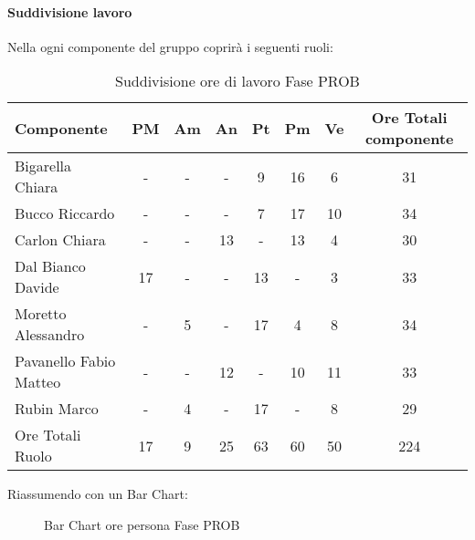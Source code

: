 			\paragraph{Suddivisione lavoro}
				Nella  ogni componente del gruppo \groupname{} coprirà i seguenti ruoli:
				\begin{table}
					\begin{center}
						\begin{tabular}{| l | c | c | c | c | c | c | c |}
							\hline
							Componente 					& PM		& Am 		& An 		& Pt 		& Pm 		& Ve 		& Ore Totali componente \\ \hline
							
							Bigarella Chiara 			& - 		& - 		& - 		& 9 		& 16 		& 6 		& 31 \\
							Bucco Riccardo 				& - 		& - 		& - 		& 7 		& 17		& 10 		& 34 \\
							Carlon Chiara	 			& - 		& - 		& 13 		& - 		& 13 		& 4 		& 30 \\
							Dal Bianco Davide 			& 17 		& - 		& - 		& 13 		& - 		& 3 		& 33 \\
							Moretto Alessandro 			& - 		& 5 		& - 		& 17 		& 4 		& 8 		& 34 \\
							Pavanello Fabio Matteo	 	& - 		& - 		& 12 		& - 		& 10 		& 11 		& 33 \\
							Rubin Marco					& - 		& 4 		& - 		& 17 		& - 		& 8 		& 29 \\ \hline \hline
							
							Ore Totali Ruolo 			& 17 		& 9 		& 25 		& 63 		& 60 		& 50 		& 224	\\ \hline
						\end{tabular}
					\end{center}
					\caption{Suddivisione ore di lavoro Fase PROB}
				\end{table}
				Riassumendo con un Bar Chart:
				\begin{figure}\centering
					\caption{Bar Chart ore persona Fase PROB}
				\end{figure}
